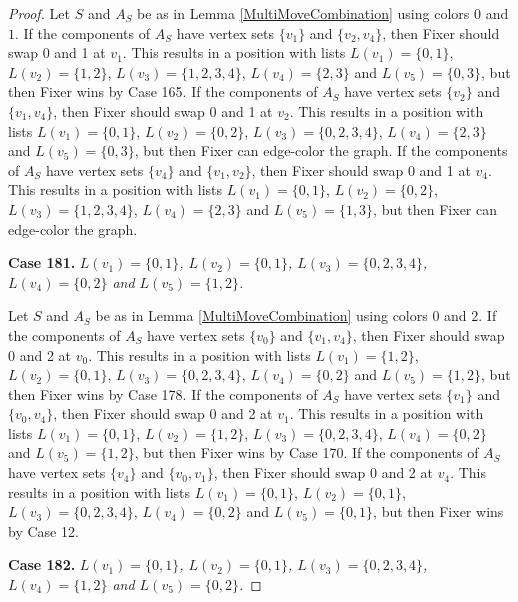 \documentclass[12pt]{amsart}
\theoremstyle{plain}
\theoremstyle{definition}
\theoremstyle{remark}
\begin{document}
\begin{proof}
Let $S$ and $A_S$ be as in Lemma \ref{MultiMoveCombination} using colors $0$ and $1$. If the components of $A_S$ have vertex sets $\{v_1\}$ and $\{v_2, v_4\}$, then Fixer should swap 0 and 1 at $v_1$. This results in a position with lists $L(v_1) = \{0, 1\}$, $L(v_2) = \{1, 2\}$, $L(v_3) = \{1, 2, 3, 4\}$, $L(v_4) = \{2, 3\}$ and $L(v_5) = \{0, 3\}$, but then Fixer wins by Case 165. If the components of $A_S$ have vertex sets $\{v_2\}$ and $\{v_1, v_4\}$, then Fixer should swap 0 and 1 at $v_2$. This results in a position with lists $L(v_1) = \{0, 1\}$, $L(v_2) = \{0, 2\}$, $L(v_3) = \{0, 2, 3, 4\}$, $L(v_4) = \{2, 3\}$ and $L(v_5) = \{0, 3\}$, but then Fixer can edge-color the graph. If the components of $A_S$ have vertex sets $\{v_4\}$ and $\{v_1, v_2\}$, then Fixer should swap 0 and 1 at $v_4$. This results in a position with lists $L(v_1) = \{0, 1\}$, $L(v_2) = \{0, 2\}$, $L(v_3) = \{1, 2, 3, 4\}$, $L(v_4) = \{2, 3\}$ and $L(v_5) = \{1, 3\}$, but then Fixer can edge-color the graph. 

\noindent\textbf{Case 181.  }\textit{$L(v_1) = \{0, 1\}$, $L(v_2) = \{0, 1\}$, $L(v_3) = \{0, 2, 3, 4\}$, $L(v_4) = \{0, 2\}$ and $L(v_5) = \{1, 2\}$.}

Let $S$ and $A_S$ be as in Lemma \ref{MultiMoveCombination} using colors $0$ and $2$. If the components of $A_S$ have vertex sets $\{v_0\}$ and $\{v_1, v_4\}$, then Fixer should swap 0 and 2 at $v_0$. This results in a position with lists $L(v_1) = \{1, 2\}$, $L(v_2) = \{0, 1\}$, $L(v_3) = \{0, 2, 3, 4\}$, $L(v_4) = \{0, 2\}$ and $L(v_5) = \{1, 2\}$, but then Fixer wins by Case 178. If the components of $A_S$ have vertex sets $\{v_1\}$ and $\{v_0, v_4\}$, then Fixer should swap 0 and 2 at $v_1$. This results in a position with lists $L(v_1) = \{0, 1\}$, $L(v_2) = \{1, 2\}$, $L(v_3) = \{0, 2, 3, 4\}$, $L(v_4) = \{0, 2\}$ and $L(v_5) = \{1, 2\}$, but then Fixer wins by Case 170. If the components of $A_S$ have vertex sets $\{v_4\}$ and $\{v_0, v_1\}$, then Fixer should swap 0 and 2 at $v_4$. This results in a position with lists $L(v_1) = \{0, 1\}$, $L(v_2) = \{0, 1\}$, $L(v_3) = \{0, 2, 3, 4\}$, $L(v_4) = \{0, 2\}$ and $L(v_5) = \{0, 1\}$, but then Fixer wins by Case 12. 

\noindent\textbf{Case 182.  }\textit{$L(v_1) = \{0, 1\}$, $L(v_2) = \{0, 1\}$, $L(v_3) = \{0, 2, 3, 4\}$, $L(v_4) = \{1, 2\}$ and $L(v_5) = \{0, 2\}$.}


\end{proof}
\end{document}
